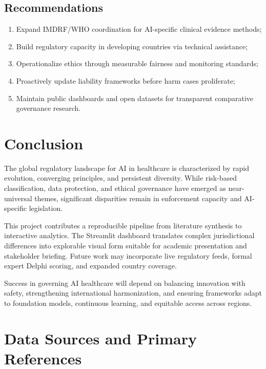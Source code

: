 \documentclass[12pt,a4paper]{report}
\begin{document}
\section{Recommendations}

\begin{enumerate}[noitemsep]
  \item Expand IMDRF/WHO coordination for AI-specific clinical evidence methods;
  \item Build regulatory capacity in developing countries via technical assistance;
  \item Operationalize ethics through measurable fairness and monitoring standards;
  \item Proactively update liability frameworks before harm cases proliferate;
  \item Maintain public dashboards and open datasets for transparent comparative governance research.
\end{enumerate}

\chapter{Conclusion}
\label{ch:conclusion}

The global regulatory landscape for AI in healthcare is characterized by rapid evolution, converging principles, and persistent diversity. While risk-based classification, data protection, and ethical governance have emerged as near-universal themes, significant disparities remain in enforcement capacity and AI-specific legislation.

This project contributes a reproducible pipeline from literature synthesis to interactive analytics. The Streamlit dashboard translates complex jurisdictional differences into explorable visual form suitable for academic presentation and stakeholder briefing. Future work may incorporate live regulatory feeds, formal expert Delphi scoring, and expanded country coverage.

Success in governing AI healthcare will depend on balancing innovation with safety, strengthening international harmonization, and ensuring frameworks adapt to foundation models, continuous learning, and equitable access across regions.

\chapter*{Data Sources and Primary References}
\end{document}
